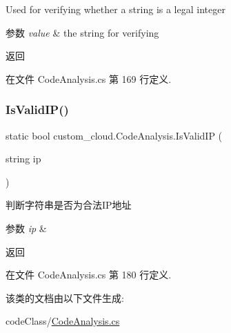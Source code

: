 Used for verifying whether a string is a legal integer 


\begin{DoxyParams}{参数}
{\em value} & the string for verifying\\
\hline
\end{DoxyParams}
\begin{DoxyReturn}{返回}

\end{DoxyReturn}


在文件 Code\+Analysis.\+cs 第 169 行定义.

\mbox{\label{classcustom__cloud_1_1_code_analysis_a09b98c4da70cc952058b2a8db7fcdd0b}} 
\subsubsection{\texorpdfstring{Is\+Valid\+I\+P()}{IsValidIP()}}
{\footnotesize\ttfamily static bool custom\+\_\+cloud.\+Code\+Analysis.\+Is\+Valid\+IP (\begin{DoxyParamCaption}\item[{string}]{ip }\end{DoxyParamCaption})\hspace{0.3cm}{\ttfamily [static]}}



判断字符串是否为合法\+I\+P地址 


\begin{DoxyParams}{参数}
{\em ip} & \\
\hline
\end{DoxyParams}
\begin{DoxyReturn}{返回}

\end{DoxyReturn}


在文件 Code\+Analysis.\+cs 第 180 行定义.



该类的文档由以下文件生成\+:\begin{DoxyCompactItemize}
\item 
code\+Class/\hyperlink{_code_analysis_8cs}{Code\+Analysis.\+cs}\end{DoxyCompactItemize}
